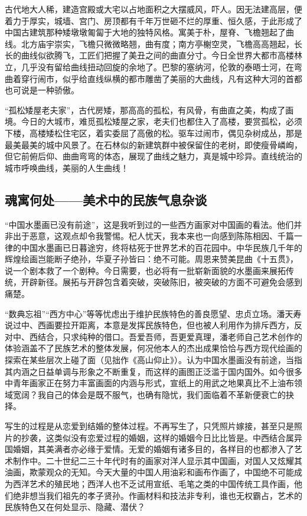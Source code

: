 \documentclass{article}
\begin{document}
古代地大人稀，建造宫殿或大宅以占地面积之大摆威风，吓人。因无法建高层，便着力于厚实，城墙、宫门、房顶都有千年万世砸不烂的厚重、恒久感，于此形成了中国古建筑那种矮墩墩匍匐于大地的独特风格。寓美于朴，屋脊、飞檐翘起了曲线。北方庙宇崇实，飞檐只微微略翘，曲有度；南方亭榭空灵，飞檐高高翘起，长长的曲线似欲腾飞，工匠们把握了美丑之间的曲直分寸。今日全世界大都市高楼林立，几乎没有留给曲线扭动回旋的余地了。巴黎的塞纳河，伦敦的泰晤士河，在弯曲着穿行闹市，似乎给直线纵横的都市雕凿了美丽的大曲线，凡有这种大河的首都也可说是一种骄傲。

“孤松矮屋老夫家”，古代房矮，那高高的孤松，有风骨，有曲直之美，构成了画境。今日的大城市，难觅孤松矮屋之家，老夫们也都住入了高楼，要赏孤松，必须下楼，高楼矮松住宅区，着实委屈了高傲的松。驱车过闹市，偶见杂树成丛，那是最美最美的城中风景了。在石林似的新建筑群中被保留住的老树，即使瘦骨嶙峋，但它前俯后仰、曲曲弯弯的体态，展现了曲线之魅力，真是城中珍异。直线统治的城市呼唤曲线，美丽的人生曲线！
\subsection{魂寓何处——美术中的民族气息杂谈}
“中国水墨画已没有前途”，这是我听到过的一些西方画家对中国画的看法。他们并非出于恶意，这观点却令我警惕。杞人忧天，我本来也一向感到陈陈相因、千篇一律的中国水墨画已日暮途穷，终将枯死于世界艺术的百花园中。中华民族几千年的辉煌绘画岂能断子绝孙，华夏子孙皆曰：绝不可能。周恩来赞美昆曲《十五贯》，说一个剧本救了一个剧种。今日需要，也必将有一批崭新面貌的水墨画来展拓传统，开辟新径。展拓与开辟包含着突破，突破陈旧，被突破的方面不可避免会感到痛楚。

“数典忘祖”“西方中心”等等忧虑出于维护民族特色的善良愿望、忠贞立场。潘天寿说过中、西画要拉开距离，本意是发挥民族特色，但也被人利用作为排斥西方，反对中、西结合，只求纯种的借口。吾爱吾师，吾更爱真理，潘老师自己艺术创作的体验涵盖不了民族艺术的整体发展，何况他本人的杰出成果恰恰与西方现代绘画的探索在某些层次上碰了面（见拙作《高山仰止》）。认为中国水墨画没有前途，当指其内涵之日益单调与形象之不断重复，而这样的画图正泛滥于国内国外。如今很多中青年画家正在努力丰富画面的内涵与形式，宣纸上的用武之地果真比不上油布领域宽阔？我自己的体会是既不服气，也确有隐忧，我们面临着不革新便衰亡的抉择。

写生的过程是从恋爱到结婚的整体过程。不再写生了，只凭照片嫁接，甚至只是照片的抄袭，这类似没有恋爱过程的婚姻，这样的婚姻今日比比皆是。中西结合属异国婚姻，其美满者亦必缘于爱情。无爱的婚姻有诸多目的，各样目的也都渗入了艺术制作中。二十世纪二三十年代时有的画家对洋人显示其中国画，对国人又炫耀其油画，欺蒙观众的无知。今天大量的中国人用油彩和画布作画了，中国绝不可能成为西洋艺术的殖民地；西洋人也不乏试用宣纸、毛笔之类的中国传统工具作画，他们绝非想当我们祖先的孝子贤孙。作画材料和技法非专利，谁也无权霸占，艺术的民族特色又在何处显示、隐藏、潜伏？
\end{document}

